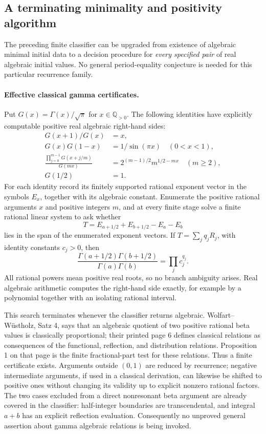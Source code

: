 \documentclass[11pt,a4paper]{article}
\theoremstyle{definition}
\theoremstyle{remark}
\numberwithin{equation}{section}
\begin{document}
\subsection{A terminating minimality and positivity algorithm}

The preceding finite classifier can be upgraded from existence of algebraic
minimal initial data to a decision procedure for \emph{every specified pair}
of real algebraic initial values. No general period-equality conjecture is
needed for this particular recurrence family.

\paragraph{Effective classical gamma certificates.}
Put $G(x)=\Gamma(x)/\sqrt\pi$ for $x\in\mathbb Q_{>0}$.
The following identities have explicitly computable positive real algebraic
right-hand sides:
\begin{align*}
 G(x+1)/G(x)&=x,\\
 G(x)G(1-x)&=1/\sin(\pi x)\quad(0<x<1),\\
 \frac{\prod_{j=0}^{m-1}G(x+j/m)}{G(mx)}
 &=2^{(m-1)/2}m^{1/2-mx}\quad(m\geq2),\\
 G(1/2)&=1.
\end{align*}
For each identity record its finitely supported rational exponent vector
in the symbols $E_x$, together with its algebraic constant. Enumerate the
positive rational arguments $x$ and positive integers $m$, and at every
finite stage solve a finite rational linear system to ask whether
\[
 T=E_{a+1/2}+E_{b+1/2}-E_a-E_b
\]
lies in the span of the enumerated exponent vectors. If
$T=\sum_j q_jR_j$, with identity constants $c_j>0$, then
\[
 \frac{\Gamma(a+1/2)\Gamma(b+1/2)}{\Gamma(a)\Gamma(b)}
 =\prod_j c_j^{q_j}.
\]
All rational powers mean positive real roots, so no branch ambiguity arises.
Real algebraic arithmetic computes the right-hand side exactly, for example
by a polynomial together with an isolating rational interval.

This search terminates whenever the classifier returns algebraic.
Wolfart--W\"ustholz, Satz 4, says that an algebraic quotient of two positive
rational beta values is classically proportional; their printed page 6
defines classical relations as consequences of the functional, reflection,
and distribution relations. Proposition 1 on that page is the finite
fractional-part test for these relations. Thus a finite certificate exists.
Arguments outside $(0,1)$ are reduced by recurrence; negative intermediate
arguments, if used in a classical derivation, can likewise be shifted to
positive ones without changing its validity up to explicit nonzero rational
factors. The two cases excluded from a direct nonresonant beta argument
are already covered in the classifier: half-integer boundaries are
transcendental, and integral $a+b$ has an explicit reflection evaluation.
Consequently no unproved general assertion about gamma algebraic relations
is being invoked.
\end{document}
